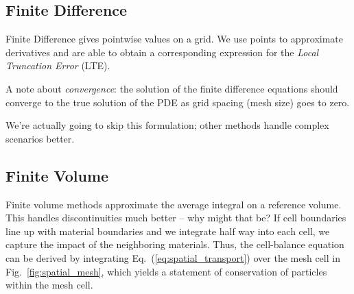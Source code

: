 \documentclass[12pt]{article}
\begin{document}
\subsection*{Finite Difference}

Finite Difference gives pointwise values on a grid. We use points to
approximate derivatives and are able to obtain a corresponding
expression for the \textit{Local Truncation Error} (LTE).

A note about \textit{convergence}: the solution of the finite difference
equations should converge to the true solution of the PDE as grid spacing
(mesh size) goes to zero.	

We're actually going to skip this formulation; other methods handle complex
scenarios better.

\subsection*{Finite Volume}
Finite volume methods approximate the average integral on a reference volume.
This handles discontinuities much better -- why might that be? If cell
boundaries line up with material boundaries and we integrate half way into each
cell, we capture the impact of the neighboring materials. Thus, the
cell-balance equation can be derived by integrating
Eq.~(\ref{eq:spatial_transport}) over the mesh cell in
Fig.~\ref{fig:spatial_mesh}, which yields
a statement of conservation of particles within the mesh cell. 
\end{document}
